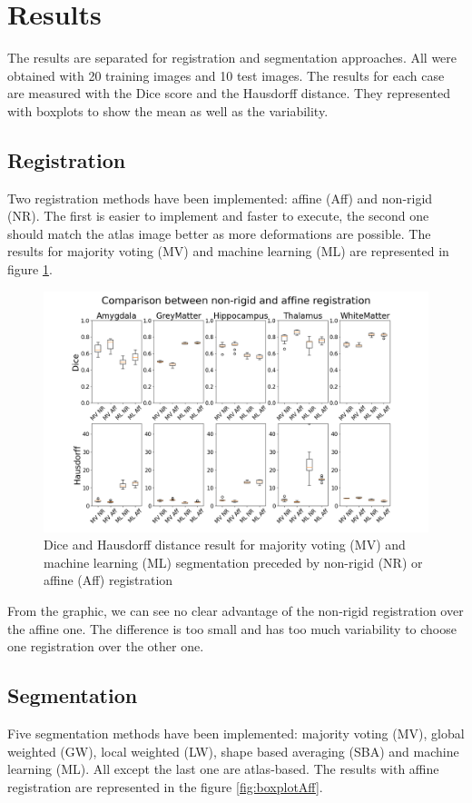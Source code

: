 \section*{Results}
The results are separated for registration and segmentation approaches. All were obtained with 20 training images and 10 test images. The results for each case are measured with the Dice score and the Hausdorff distance. They represented with boxplots to show the mean as well as the variability.

\subsection*{Registration}
Two registration methods have been implemented: affine (Aff) and non-rigid (NR). The first is easier to implement and faster to execute, the second one should match the atlas image better as more deformations are possible. The results for majority voting (MV) and machine learning (ML) are represented in figure \ref{fig:boxplotReg}.

\begin{figure}[h!]
	\centering
	\includegraphics[width = .48 \textwidth]{img/boxplotComparisonNRAff}
	\caption{Dice and Hausdorff distance result for majority voting (MV) and machine learning (ML) segmentation preceded by non-rigid (NR) or affine (Aff) registration}
	\label{fig:boxplotReg}
\end{figure}

From the graphic, we can see no clear advantage of the non-rigid registration over the affine one. The difference is too small and has too much variability to choose one registration over the other one.

\subsection*{Segmentation}
Five segmentation methods have been implemented: majority voting (MV), global weighted (GW), local weighted (LW), shape based averaging (SBA) and machine learning (ML). All except the last one are atlas-based. The results with affine registration are represented in the figure \ref{fig:boxplotAff}.

